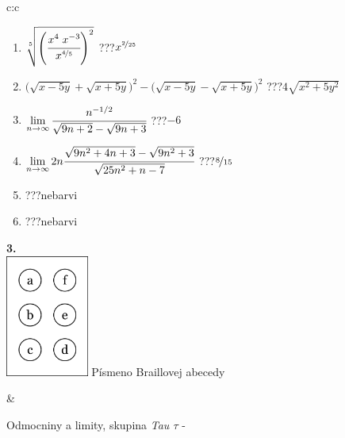 \documentclass[10pt]{report}
\begin{document}
\begin{tabular}{c:c}
\begin{minipage}[c][104.5mm][t]{0.5\linewidth}
\begin{center}
\begin{minipage}{0.79\linewidth}
\begin{center}
\begin{varwidth}{\linewidth}
\begin{enumerate}
\small
\item $\sqrt[5]{\left(\cfrac{x^{4}\;x^{-3}}{x^{\nicefrac{4}{5}}}\right)^{2}}$\quad \dotfill\; ???\;\dotfill \quad $x^{\nicefrac{2}{25}}$
\item {\footnotesize{\scriptsize$\big(\sqrt{x-5y}+\sqrt{x+5y}\big)^2-\big(\sqrt{x-5y}-\sqrt{x+5y}\big)^2$}\quad \dotfill\; ???\;\dotfill \quad $4\sqrt{x^2+5y^2}$}
\item $\lim\limits_{n\to\infty}\cfrac{n^{-1/2}}{\sqrt{9n+2}-\sqrt{9n+3}}$\quad \dotfill\; ???\;\dotfill \quad $-6$
\item $\lim\limits_{n\to\infty}2n\cfrac{\sqrt{9n^2+4n+3}-\sqrt{9n^2+3}}{\sqrt{25n^2+n-7}}$\quad \dotfill\; ???\;\dotfill \quad $\nicefrac{8}{15}$
\item \quad \dotfill\; ???\;\dotfill \quad nebarvi
\item \quad \dotfill\; ???\;\dotfill \quad nebarvi
\end{enumerate}
\end{varwidth}
\end{center}
\end{minipage}
\begin{minipage}{0.20\linewidth}
\begin{center}
{\Huge\bfseries 3.} \\[2mm]
\includegraphics[height=40mm]{../images/braille.png}
{\small Písmeno Braillovej abecedy}
\end{center}
\end{minipage}
\end{center}
\end{minipage}
&
\begin{minipage}[c][104.5mm][t]{0.5\linewidth}
\begin{center}
\vspace{7mm}
{\huge Odmocniny a limity, skupina \textit{Tau $\tau$} -}\\[5mm]

\end{center}
\end{minipage}
\end{tabular}
\end{document}
